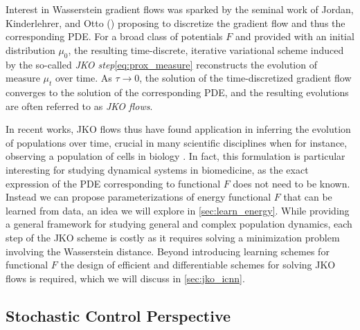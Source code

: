 Interest in Wasserstein gradient flows was sparked by the seminal work of Jordan, Kinderlehrer, and Otto (\citeyear{jordan1998variational}) proposing to discretize the gradient flow and thus the corresponding PDE. 
For a broad class of potentials $F$ and provided with an initial distribution $\mu_0$, the resulting time-discrete, iterative variational scheme induced by the so-called \emph{JKO step}\eqref{eq:prox_measure} reconstructs the evolution of measure $\mu_t$ over time. As $\tau \rightarrow 0$, the solution of the time-discretized gradient flow converges to the solution of the corresponding PDE, and the resulting evolutions are often referred to as \emph{JKO flows}.

In recent works, \acrshort{JKO} flows thus have found application in inferring the evolution of populations over time, crucial in many scientific disciplines when for instance, observing a population of cells in biology \citep{bunne2022proximal, alvarez2021optimizing, mokrov2021large, benamou2016augmented}.
In fact, this formulation is particular interesting for studying dynamical systems in biomedicine, as the exact expression of the PDE corresponding to functional $F$ does not need to be known.
Instead we can propose parameterizations of energy functional $F$ that can be learned from data, an idea we will explore in \cref{sec:learn_energy}.
While providing a general framework for studying general and complex population dynamics, each step of the JKO scheme is costly as it requires solving a minimization problem involving the Wasserstein distance. Beyond introducing learning schemes for functional $F$ the design of efficient and differentiable  schemes for solving JKO flows is required, which we will discuss in \cref{sec:jko_icnn}.


\subsection{Stochastic Control Perspective} \label{sec:background_control}

